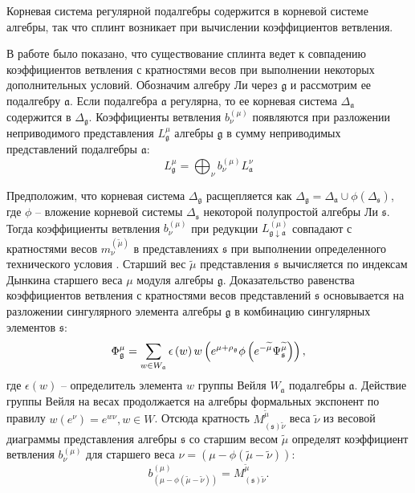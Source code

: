 \documentclass[12pt]{article}
\newcommand{\gf}{\mathfrak{g}}
\newcommand{\af}{\mathfrak{a}}
\newcommand{\sfr}{\mathfrak{s}}
\begin{document}
Корневая система регулярной подалгебры содержится в корневой системе алгебры, так что сплинт
возникает при вычислении коэффициентов ветвления. 

В работе  \cite{2011arXiv1111.6787L} было показано, что существование сплинта ведет к совпадению
коэффициентов ветвления с кратностями весов при выполнении некоторых дополнительных условий.
Обозначим алгебру Ли через $\gf$ и рассмотрим ее подалгебру $\af$. Если подалгебра  $\af$ регулярна,
то ее корневая система  $\Delta_{\af}$ содержится в $\Delta_{\gf}$. Коэффициенты ветвления $b^{(\mu)}_{\nu}$
появляются при разложении неприводимого представления  $L^{\mu}_{\gf}$ алгебры $\gf$ в сумму
неприводимых представлений подалгебры $\af$:
\begin{equation}
  \label{eq:1}
  L^{\mu}_{\gf}=\bigoplus_{\nu} b^{(\mu)}_{\nu} L^{\nu}_{\af}
\end{equation}

Предположим, что корневая система $\Delta_{\gf}$ расщепляется как  $\Delta_{\gf}=\Delta_{\af} \cup
\phi(\Delta_{\sfr})$, где  $\phi$ -- вложение корневой системы $\Delta_{\sfr}$ некоторой полупростой
алгебры Ли $\sfr$. Тогда коэффициенты ветвления $b^{(\mu)}_{\nu}$ при редукции
$L^{(\mu)}_{\gf\downarrow \af}$ совпадают с кратностями весов  $m^{(\tilde \mu)}_{\nu}$ в
представлениях  $\sfr$ при выполнении определенного технического условия \cite{2011arXiv1111.6787L}.
Старший вес  $\tilde\mu$ представления $\sfr$ вычисляется по индексам Дынкина старшего веса  $\mu$
модуля алгебры $\gf$. Доказательство равенства коэффициентов ветвления с кратностями весов
представлений $\sfr$ основывается на разложении сингулярного элемента алгебры  $\gf$ в комбинацию
сингулярных элементов $\sfr$:
\begin{equation}
 \Phi ^{\mu }_{\gf} = \sum_{w\in W_{\frak{a}}}\epsilon\left( w\right)w\left( e^{\mu +\rho _{\gf}}\phi\left( e^{-\widetilde{\mu }}\Psi^{\widetilde{\mu }}_{\sfr}\right)\right),
\end{equation}
где $\epsilon\left( w\right)$ -- определитель элемента $w$ группы Вейля $W_{\af}$ подалгебры $\af$.
Действие группы Вейля на весах продолжается на алгебры формальных экспонент по правилу
$w\left(e^{\nu}\right)=e^{w\nu}, w\in W$. Отсюда кратность $M_{\left( \sfr\right) \widetilde{\nu
  }}^{\widetilde{\mu }}$ веса $\widetilde{\nu }$ из весовой диаграммы представления алгебры $\sfr$
со старшим весом $\tilde\mu$ определят коэффициент ветвления $b_{\nu }^{(\mu )}$ для старшего веса
$\nu =\left( \mu -\phi \left( \widetilde{\mu }-\widetilde{\nu }\right) \right) $:
\begin{equation}
b_{\left( \mu -\phi \left( \widetilde{\mu }-\widetilde{\nu }\right) \right)
}^{(\mu )}=M_{\left( \sfr\right) \widetilde{\nu }}^{\widetilde{\mu }}. 
\label{bran1}
\end{equation}
\end{document}
